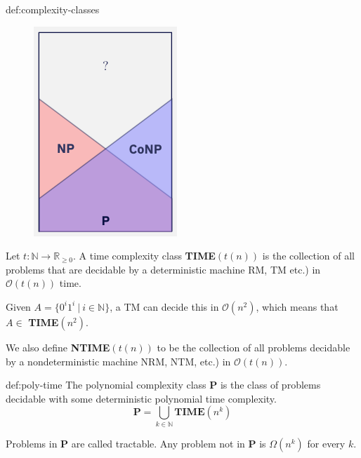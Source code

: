 \documentclass[landscape, 8pt]{extarticle}
\begin{document}
\begin{multicols}{3}
\begin{dfn}{def:complexity-classes}{}
\setlength{\columnsep}{0pt}
\begin{figure}
    \centering
    \includegraphics[width=0.7\linewidth]{images/basic-complexity-classes.png}
\end{figure}

Let $t:\mathbb{N} \to \mathbb{R}_{\geq 0}$. A time complexity class \textbf{TIME}$(t(n))$ is the collection of all problems that are decidable by a deterministic machine RM, TM etc.) in $\mathcal{O}(t(n))$ time.

Given $A = \{0^i1^i \:|\: i \in \mathbb{N}\}$, a TM can decide this in $\mathcal{O}(n^2)$, which means that $A \in$ \textbf{TIME}$(n^2)$.

We also define \textbf{NTIME}$(t(n))$ to be the collection of all problems decidable by a nondeterministic machine NRM, NTM, etc.) in $\mathcal{O}(t(n))$.
\end{dfn}

\begin{dfn}{def:poly-time}{}
The polynomial complexity class \textbf{P} is the class of problems decidable with some deterministic polynomial time complexity.
\[\textbf{P} = \bigcup_{k \in \mathbb{N}} \textbf{TIME}(n^k)\]

Problems in \textbf{P} are called tractable. Any problem not in \textbf{P} is $\Omega(n^k)$ for every $k$.


\end{dfn}
\end{multicols}
\end{document}
